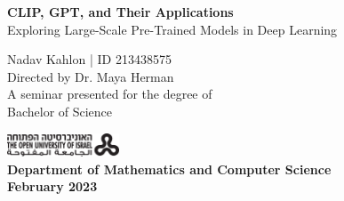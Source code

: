 \documentclass{article}
\begin{document}




\begin{titlepage}
    \begin{center}
    
        \vspace*{7cm}
        \Huge \textbf{CLIP, GPT, and Their Applications} \\    
        \vspace{0.25cm}
        \huge {Exploring Large-Scale Pre-Trained Models in Deep Learning}
            
        \vspace{2.5cm}
        \LARGE {Nadav Kahlon | ID 213438575 \\
                Directed by Dr. Maya Herman} \\
        \vspace{0.5cm}
        \Large {A seminar presented for the degree of \\
                Bachelor of Science}
            
        \vfill
        \includegraphics[width=0.25\textwidth]{university.png} \\
        \large \textbf{Department of Mathematics and Computer Science \\
                       February 2023}
            
    \end{center}
\end{titlepage}




\setcounter{tocdepth}{2}
\tableofcontents



\end{document}
